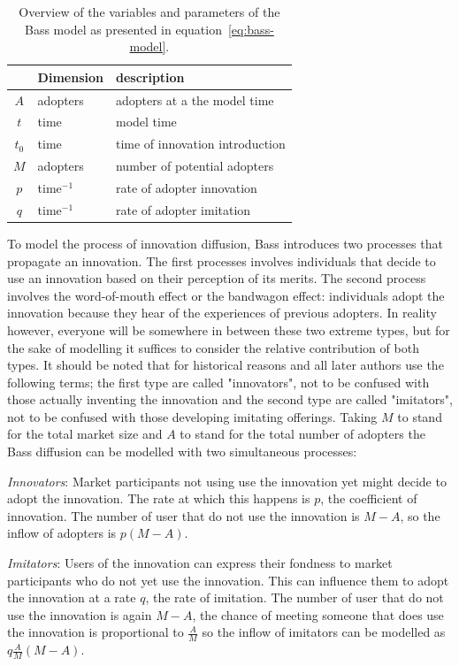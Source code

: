 \documentclass[smallextended,final]{svjour3}
\begin{document}
\begin{table}
\centering\small
\caption[Bass model variables and parameters]{Overview of the variables and parameters of the Bass model as presented in equation~\eqref{eq:bass-model}.}
\label{tbl:bass-model}
\begin{tabular}{cll}
\toprule
& Dimension & description \\
\midrule
$A$   & adopters    & adopters at a the model time \\
$t$   & time        & model time \\
\midrule
$t_0$ & time        & time of innovation introduction \\
$M$   & adopters    & number of potential adopters \\
$p$   & time$^{-1}$ & rate of adopter innovation \\
$q$   & time$^{-1}$ & rate of adopter imitation \\
\bottomrule
\end{tabular}
\end{table}

To model the process of innovation diffusion, Bass \citep{bass69} introduces two processes that propagate an innovation. The first processes involves individuals that decide to use an innovation based on their perception of its merits. The second process involves the word-of-mouth effect or the bandwagon effect: individuals adopt the innovation because they hear of the experiences of previous adopters. In reality however, everyone will be somewhere in between these two extreme types, but for the sake of modelling it suffices to consider the relative contribution of both types. It should be noted that for historical reasons \citet{bass69} and all later authors use the following terms; the first type are called "innovators", not to be confused with those actually inventing the innovation and the second type are called "imitators", not to be confused with those developing imitating offerings. Taking $M$ to stand for the total market size and $A$ to stand for the total number of adopters the Bass diffusion can be modelled with two simultaneous processes:

\emph{Innovators}: Market participants not using use the innovation yet might decide to adopt the innovation. The rate at which this happens is $p$, the coefficient of innovation. The number of user that do not use the innovation is $M-A$, so the inflow of adopters is $p(M-A)$.

\emph{Imitators}: Users of the innovation can express their fondness to market participants who do not yet use the innovation. This can influence them to adopt the innovation at a rate $q$, the rate of imitation. The number of user that do not use the innovation is again $M-A$, the chance of meeting someone that does use the innovation is proportional to $\frac{A}{M}$ so the inflow of imitators can be modelled as $q\frac{A}{M}(M-A)$.
\end{document}
